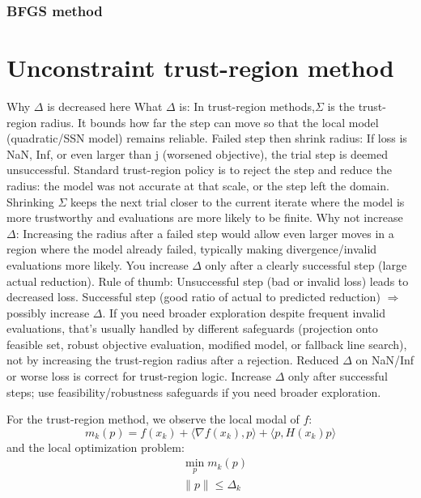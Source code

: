\begin{definition}
	
\end{definition}

\subsubsection{BFGS method}



\section{Unconstraint trust-region method}
Why $\Delta$ is decreased here
What $\Delta$ is: In trust-region methods,$\Sigma$ is the trust-region radius. It bounds how far the step can move so that the local model (quadratic/SSN model) remains reliable.
Failed step then shrink radius: If loss is NaN, Inf, or even larger than j (worsened objective), the trial step is deemed unsuccessful. Standard trust-region policy is to reject the step and reduce the radius: the model was not accurate at that scale, or the step left the domain. Shrinking $\Sigma$ keeps the next trial closer to the current iterate where the model is more trustworthy and evaluations are more likely to be finite.
Why not increase $\Delta$: Increasing the radius after a failed step would allow even larger moves in a region where the model already failed, typically making divergence/invalid evaluations more likely. You increase $\Delta$ only after a clearly successful step (large actual reduction).
Rule of thumb:
Unsuccessful step (bad or invalid loss) leads to decreased loss.
Successful step (good ratio of actual to predicted reduction) $\Rightarrow$ possibly increase $\Delta$.
If you need broader exploration despite frequent invalid evaluations, that’s usually handled by different safeguards (projection onto feasible set, robust objective evaluation, modified model, or fallback line search), not by increasing the trust-region radius after a rejection.
Reduced $\Delta$ on NaN/Inf or worse loss is correct for trust-region logic.
Increase $\Delta$ only after successful steps; use feasibility/robustness safeguards if you need broader exploration.



For the trust-region method, we observe the local modal of $f$:
\[
m_k(p) = f(x_k) + \langle \nabla f(x_k), p \rangle + \langle p, H(x_k) p \rangle
\]
and the local optimization problem:
\begin{align*}
	\tag{QP}
	& \min_p m_k(p)\\
	& \|p\| \le \Delta_k 
\end{align*}

